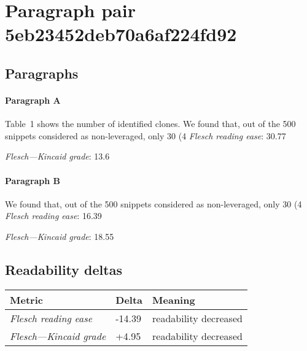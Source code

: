 \section{Paragraph pair 5eb23452deb70a6af224fd92}
\subsection{Paragraphs}
\paragraph{Paragraph A}
Table 1 shows the number of identified clones. We found that, out of the 500 snippets considered as non-leveraged, only 30 (4%
\emph{Flesch reading ease}: 30.77\par
\emph{Flesch---Kincaid grade}: 13.6

\paragraph{Paragraph B}
We found that, out of the 500 snippets considered as non-leveraged, only 30 (4%
\emph{Flesch reading ease}: 16.39\par
\emph{Flesch---Kincaid grade}: 18.55

\subsection{Readability deltas}

\begin{tabular}{lll}
\toprule
               \textbf{Metric} & \textbf{Delta} &       \textbf{Meaning} \\
\midrule
    \emph{Flesch reading ease} &         -14.39 &  readability decreased \\
 \emph{Flesch---Kincaid grade} &          +4.95 &  readability decreased \\
\bottomrule
\end{tabular}

